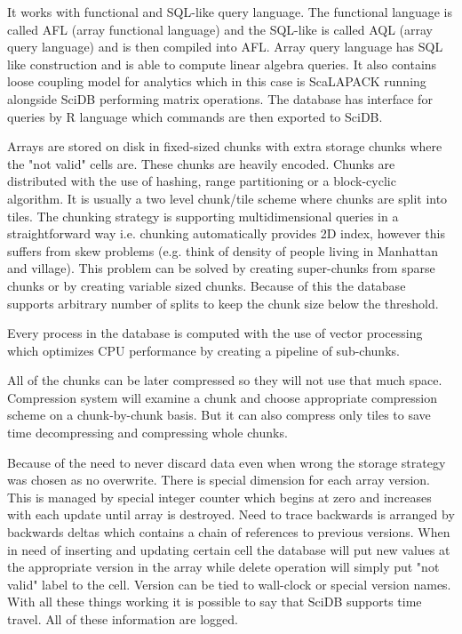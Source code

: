 It works with functional and SQL-like query language. The functional language is called AFL (array functional language) and the SQL-like is called AQL (array query language) and is then compiled into AFL. Array query language has SQL like construction and is able to compute linear algebra queries. It also contains loose coupling model for analytics which in this case is ScaLAPACK running alongside SciDB performing matrix operations. The database has interface for queries by R language which commands are then exported to SciDB.

Arrays are stored on disk in fixed-sized chunks with extra storage chunks where the "not valid" cells are. These chunks are heavily encoded. Chunks are distributed with the use of hashing, range partitioning or a block-cyclic algorithm. It is usually a two level chunk/tile scheme where chunks are split into tiles. The chunking strategy is supporting multidimensional queries in a straightforward way i.e. chunking automatically provides 2D index, however this suffers from skew problems (e.g. think of density of people living in Manhattan and village). This problem can be solved by creating super-chunks from sparse chunks or by creating variable sized chunks. Because of this the database supports arbitrary number of splits to keep the chunk size below the threshold.

Every process in the database is computed with the use of vector processing which optimizes CPU performance by creating a pipeline of sub-chunks.

All of the chunks can be later compressed so they will not use that much space. Compression system will examine a chunk and choose appropriate compression scheme on a chunk-by-chunk basis. But it can also compress only tiles to save time decompressing and compressing whole chunks.

Because of the need to never discard data even when wrong the storage strategy was chosen as no overwrite. There is special dimension for each array version. This is managed by special integer counter which begins at zero and increases with each update until array is destroyed. Need to trace backwards is arranged by backwards deltas which contains a chain of references to previous versions. When in need of inserting and updating certain cell the database will put new values at the appropriate version in the array while delete operation will simply put "not valid" label to the cell. Version can be tied to wall-clock or special version names. With all these things working it is possible to say that SciDB supports time travel. All of these information are logged.

